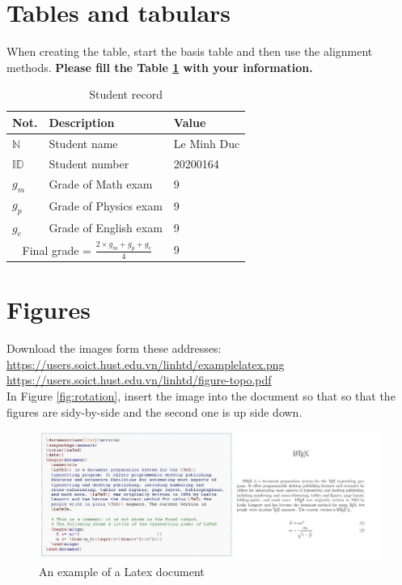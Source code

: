 \documentclass[a4paper,10pt,twocolumn]{article}
\begin{document}
\section{Tables and tabulars}
When creating the table, start the basis table and then use the alignment methods. \textbf{Please fill the Table \ref{tab:ttt} with your information.}\\
\begin{table}[h]
\centering
\begin{tabular}{l|l|l}
\hline\hline
\textbf{Not.} & \textbf{Description} & \textbf{Value}\\
\hline
$\mathbb{N}$ & Student name & Le Minh Duc\\
$\mathbb{ID}$ & Student number & 20200164\\
\hline
$g_m$ & Grade of Math exam & 9\\
$g_p$ & Grade of Physics exam & 9\\
$g_e$ & Grade of English exam & 9\\
\hline
\multicolumn{2}{c|}{Final grade = $ \frac{2\times g_m+g_p+g_e}{4}$} & 9\\
\hline\hline
\end{tabular}\caption{Student record}
\label{tab:ttt}
\end{table}

\section{Figures}
Download the images form these addresses:\\
\url{https://users.soict.hust.edu.vn/linhtd/examplelatex.png}\\
\url{https://users.soict.hust.edu.vn/linhtd/figure-topo.pdf}\\
In Figure \ref{fig:rotation}, insert the image into the document so that so that the figures are sidy-by-side and the second one is up side down.
\begin{figure}[H]
\centering
\includegraphics[scale=0.35]{examplelatex.png}
\caption{An example of a Latex document}
\end{figure}
\end{document}
